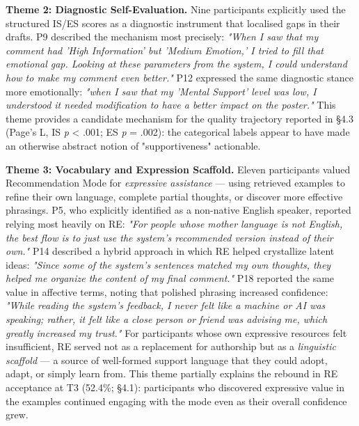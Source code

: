 \documentclass[]{llncs}
\begin{document}






\textbf{Theme 2: Diagnostic Self-Evaluation.} Nine participants explicitly used the structured IS/ES scores as a diagnostic instrument that localised gaps in their drafts. P9 described the mechanism most precisely: \textit{"When I saw that my comment had 'High Information' but 'Medium Emotion,' I tried to fill that emotional gap. Looking at these parameters from the system, I could understand how to make my comment even better."} P12 expressed the same diagnostic stance more emotionally: \textit{"when I saw that my 'Mental Support' level was low, I understood it needed modification to have a better impact on the poster."} This theme provides a candidate mechanism for the quality trajectory reported in §4.3 (Page's L, IS \textit{p} < .001; ES \textit{p} = .002): the categorical labels appear to have made an otherwise abstract notion of "supportiveness" actionable.

\textbf{Theme 3: Vocabulary and Expression Scaffold.} 
Eleven participants valued Recommendation Mode for \textit{expressive assistance} — using retrieved examples to refine their own language, complete partial thoughts, or discover more effective phrasings. P5, who explicitly identified as a non-native English speaker, reported relying most heavily on RE: \textit{"For people whose mother language is not English, the best flow is to just use the system's recommended version instead of their own."} P14 described a hybrid approach in which RE helped crystallize latent ideas: \textit{"Since some of the system's sentences matched my own thoughts, they helped me organize the content of my final comment."} P18 reported the same value in affective terms, noting that polished phrasing increased confidence: \textit{"While reading the system's feedback, I never felt like a machine or AI was speaking; rather, it felt like a close person or friend was advising me, which greatly increased my trust."} For participants whose own expressive resources felt insufficient, RE served not as a replacement for authorship but as a \textit{linguistic scaffold} — a source of well-formed support language that they could adopt, adapt, or simply learn from. This theme partially explains the rebound in RE acceptance at T3 (52.4\%; §4.1): participants who discovered expressive value in the examples continued engaging with the mode even as their overall confidence grew.
\end{document}
